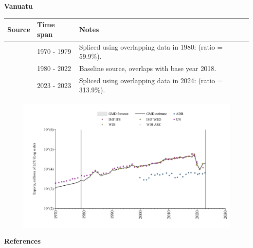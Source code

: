 \documentclass[12pt,a4paper,landscape]{article}
\begin{document}
\begin{adjustbox}{max totalsize={\paperwidth}{\paperheight},center}
\begin{minipage}[t][\textheight][t]{\textwidth}
\vspace*{0.5cm}
{}
\begin{center}
{\Large\bfseries Vanuatu}
\end{center}
\vspace{0.5cm}
\begin{table}[H]
\centering
\small
\begin{tabular}{|l|l|l|}
\hline
\textbf{Source} & \textbf{Time span} & \textbf{Notes} \\
\hline
\rowcolor{white}\cite{UN}& 1970 - 1979 &Spliced using overlapping data in 1980: (ratio = 59.9\%).\\
\rowcolor{lightgray}\cite{WDI}& 1980 - 2022 &Baseline source, overlaps with base year 2018.\\
\rowcolor{white}\cite{ADB}& 2023 - 2023 &Spliced using overlapping data in 2024: (ratio = 313.9\%).\\
\hline
\end{tabular}
\end{table}
\begin{figure}[H]
\centering
\includegraphics[width=\textwidth,height=0.6\textheight,keepaspectratio]{graphs/VUT_exports.pdf}
\end{figure}
\end{minipage}
\end{adjustbox}
{}
\begin{center}
{\Large\bfseries References}
\end{center}
\small


\end{document}

